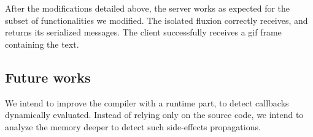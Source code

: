 After the modifications detailed above, the server works as expected for the subset of functionalities we modified.
The isolated fluxion correctly receives, and returns its serialized messages.
The client successfully receives a gif frame containing the text.

\subsection{Future works}

We intend to improve the compiler with a runtime part, to detect callbacks dynamically evaluated.
Instead of relying only on the source code, we intend to analyze the memory deeper to detect such side-effects propagations.



